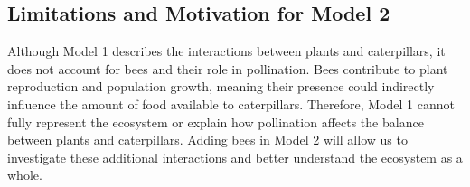 \documentclass{article}
\begin{document}
\subsection{Limitations and Motivation for Model 2}

Although Model 1 describes the interactions between plants and caterpillars, it does not account for bees and their role in pollination. Bees contribute to plant reproduction and population growth, meaning their presence could indirectly influence the amount of food available to caterpillars. Therefore, Model 1 cannot fully represent the ecosystem or explain how pollination affects the balance between plants and caterpillars. Adding bees in Model 2 will allow us to investigate these additional interactions and better understand the ecosystem as a whole.
\end{document}
